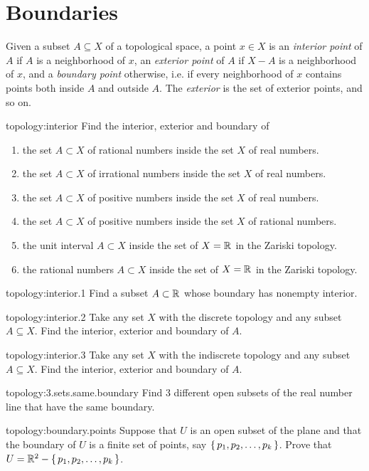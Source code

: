\section{Boundaries}
Given a subset \(A \subseteq X\) of a topological space, a point \(x \in X\) is an \emph{interior point} of \(A\) if \(A\) is a neighborhood of \(x\), an \emph{exterior point} of \(A\) if \(X-A\) is a neighborhood of \(x\), and a \emph{boundary point} otherwise, i.e. if every neighborhood of \(x\) contains points both inside \(A\) and outside \(A\).
The \emph{exterior} is the set of exterior points, and so on.
\begin{problem}{topology:interior}
Find the interior, exterior and boundary of
\begin{enumerate}
\item the set \(A \subset X\) of rational numbers inside the set \(X\) of real numbers.
\item the set \(A \subset X\) of irrational numbers inside the set \(X\) of real numbers.
\item the set \(A \subset X\) of positive numbers inside the set \(X\) of real numbers.
\item the set \(A \subset X\) of positive numbers inside the set \(X\) of rational numbers.
\item the unit interval \(A \subset X\) inside the set of \(X=\mathbb{R}^{}\) in the Zariski topology.
\item the rational numbers \(A \subset X\) inside the set of \(X=\mathbb{R}^{}\) in the Zariski topology.
\end{enumerate}
\end{problem}
\begin{problem}{topology:interior.1}
Find a subset \(A \subset \mathbb{R}^{}\) whose boundary has nonempty interior.
\end{problem}
\begin{problem}{topology:interior.2}
Take any set \(X\) with the discrete topology and any subset \(A \subseteq X\).
Find the interior, exterior and boundary of \(A\).
\end{problem}
\begin{problem}{topology:interior.3}
Take any set \(X\) with the indiscrete topology and any subset \(A \subseteq X\).
Find the interior, exterior and boundary of \(A\).
\end{problem}
\begin{problem}{topology:3.sets.same.boundary}
Find 3 different open subsets of the real number line that have the same boundary.
\end{problem}
\begin{problem}{topology:boundary.points}
Suppose that \(U\) is an open subset of the plane and that the boundary of \(U\) is a finite set of points, say \(\set{p_1,p_2,\dots,p_k}\).
Prove that \(U=\mathbb{R}^{2}-\set{p_1,p_2,\dots,p_k}\).
\end{problem}

